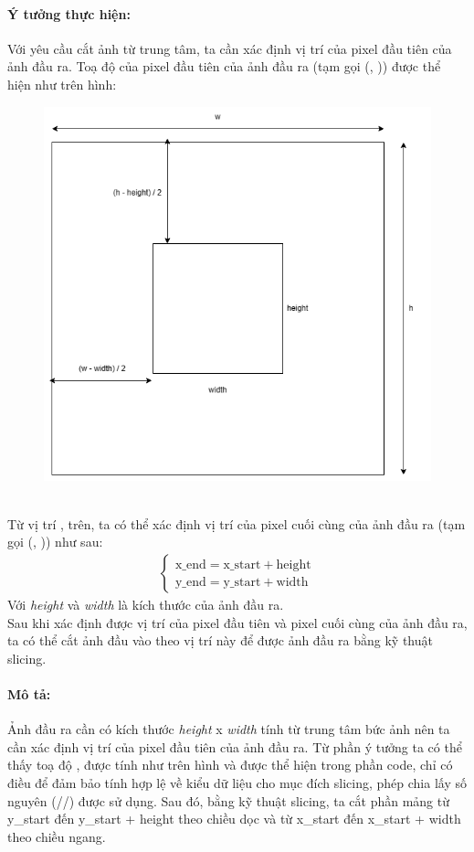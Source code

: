 \documentclass[]{article}
\begin{document}
\paragraph{Ý tưởng thực hiện:} Với yêu cầu cắt ảnh từ trung tâm, ta cần xác định vị trí của pixel đầu tiên của ảnh đầu ra. Toạ độ của pixel đầu tiên của ảnh đầu ra (tạm gọi (, )) được thể hiện như trên hình:
\begin{figure}[!ht]
\includegraphics[width = .5\textwidth]{image/square_center.png}
\end{figure} \\
Từ vị trí ,  trên, ta có thể xác định vị trí của pixel cuối cùng của ảnh đầu ra (tạm gọi (, )) như sau:
\begin{align*}
  \begin{cases}
    \text{x\_{end}} = \text{x\_{start}} + \text{height} \\
    \text{y\_{end}} = \text{y\_{start}} + \text{width}
  \end{cases}
\end{align*}
Với \textit{height} và \textit{width} là kích thước của ảnh đầu ra. \\
Sau khi xác định được vị trí của pixel đầu tiên và pixel cuối cùng của ảnh đầu ra, ta có thể cắt ảnh đầu vào theo vị trí này để được ảnh đầu ra bằng kỹ thuật slicing. 

\paragraph{Mô tả:} Ảnh đầu ra cần có kích thước \textit{height} x \textit{width} tính từ trung tâm bức ảnh  nên ta cần xác định vị trí của pixel đầu tiên của ảnh đầu ra. Từ phần ý tưởng ta có thể thấy toạ độ ,  được tính như trên hình và được thể hiện trong phần code, chỉ có điều để đảm bảo tính hợp lệ về kiểu dữ liệu cho mục đích slicing, phép chia lấy số nguyên (//) được sử dụng. Sau đó, bằng kỹ thuật slicing, ta cắt phần mảng từ y\_start đến y\_start + height theo chiều dọc và từ x\_start đến x\_start + width theo chiều ngang.
\end{document}
